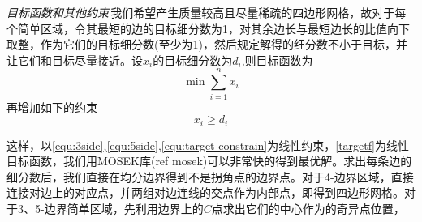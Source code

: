 \emph{目标函数和其他约束}\,我们希望产生质量较高且尽量稀疏的四边形网格，故对于每个简单区域，令其最短的边的目标细分数为1，对其余边长与最短边长的比值向下取整，作为它们的目标细分数(至少为1)，然后规定解得的细分数不小于目标，并让它们和目标尽量接近。设$x_i$的目标细分数为$d_i$,则目标函数为
\begin{equation}\label{equ:targetf}
\min \sum_{i=1}^{n} x_i
\end{equation}
再增加如下的约束
\begin{equation} \label{equ:target-constrain}
x_i \geq d_i
\end{equation}

这样，以\ref{equ:3side},\ref{equ:5side},\ref{equ:target-constrain}为线性约束，\ref{targetf}为线性目标函数，我们用MOSEK库(ref mosek)可以非常快的得到最优解。求出每条边的细分数后，我们直接在均分边界得到不是拐角点的边界点。对于4-边界区域，直接连接对边上的对应点，并两组对边连线的交点作为内部点，即得到四边形网格。对于3、5-边界简单区域，先利用边界上的$C$点求出它们的中心作为的奇异点位置，
